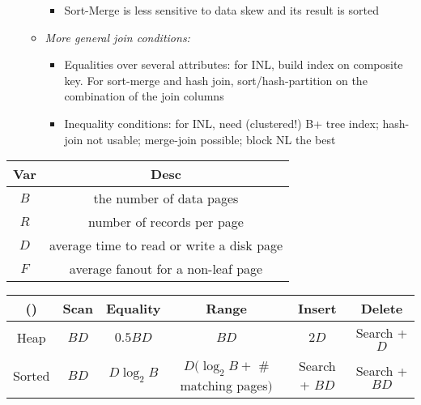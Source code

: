 \documentclass[landscape,8pt]{extarticle}
\begin{document}
\begin{multicols}{4}
\begin{itemize}
\begin{itemize}
\begin{itemize}
                \item Sort-Merge is less sensitive to data skew and its result is sorted
            \end{itemize}
            \item \emph{More general join conditions:}
            \begin{itemize}
                \item Equalities over several attributes: for INL, build index on composite key. For sort-merge and hash join, sort/hash-partition on the combination of the join columns
                \item Inequality conditions: for INL, need (clustered!) B+ tree index; hash-join not usable; merge-join possible; block NL the best
            \end{itemize}
        \end{itemize}
    \end{itemize}
    \begin{center}
        \begin{tabular}{ | c | c | } \hline
            Var     & Desc                                      \\ \hline
            $B$     & the number of data pages                  \\ \hline
            $R$     & number of records per page                \\ \hline
            $D$     & average time to read or write a disk page \\ \hline
            $F$     & average fanout for a non-leaf page        \\ \hline
        \end{tabular}
    \end{center}
    \begin{center}
        \begin{adjustbox}{angle=270}
            \begin{tabular}{ | c | c | c | c | c | c | } \hline
                ()            & Scan          & Equality              & Range                                    & Insert        & Delete        \\ \hline
                Heap          & $BD$          & $0.5 BD$              & $BD$                                     & $2D$          & Search + $D$  \\ \hline
                Sorted        & $BD$          & $D \log_2 B$          & $D(\log_2 B +$ \# matching pages$)$      & Search + $BD$ & Search + $BD$ \\ \hline

\end{tabular}
\end{adjustbox}
\end{center}
\end{multicols}
\end{document}
